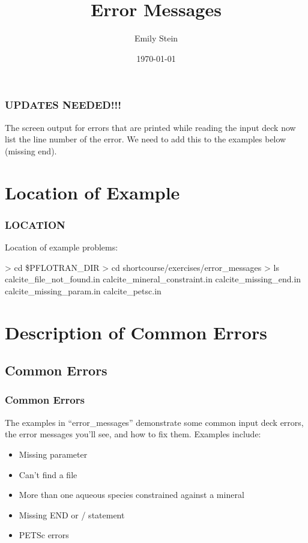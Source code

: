 \documentclass{beamer}
\newcommand\greencomment[1]{{{\color{green} #1}}}
\begin{document}
\title{Error Messages}
\author{Emily Stein}
\date{\today}


\begin{frame}\frametitle{\color{red}UPDATES NEEDED!!!}
  The screen output for errors that are printed while reading the input deck now list the line number of the error. We need to add this to the examples below (missing end).
\end{frame}

\section{Location of Example}

\begin{frame}\frametitle{LOCATION}

Location of example problems:

\begin{semiverbatim}
> cd \$PFLOTRAN_DIR
> cd shortcourse/exercises/error_messages
> ls
calcite_file_not_found.in
calcite_mineral_constraint.in
calcite_missing_end.in
calcite_missing_param.in
calcite_petsc.in
\end{semiverbatim}

\end{frame}

\section{Description of Common Errors}

\subsection{Common Errors}

\begin{frame}\frametitle{Common Errors}
The examples in ``error\_messages'' demonstrate some common input deck errors, the error messages you'll see, and how to fix them.  Examples include:
\begin{itemize}
  \item Missing parameter
  \item Can't find a file
  \item More than one aqueous species constrained against a mineral
  \item Missing \greencomment{END} or \greencomment{/} statement
  \item PETSc errors
\end{itemize}

\end{frame}
\end{document}
